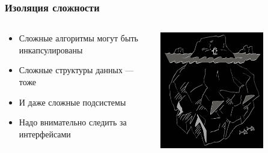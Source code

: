 \documentclass{../cscslides}
\begin{document}
    \begin{frame}
        \frametitle{Изоляция сложности}
        \begin{columns}
            \begin{column}{0.6\textwidth}
                \begin{itemize}
                    \item Сложные алгоритмы могут быть инкапсулированы
                    \item Сложные структуры данных --- тоже
                    \item И даже сложные подсистемы
                    \item Надо внимательно следить за интерфейсами
                \end{itemize}
            \end{column}
            \begin{column}{0.4\textwidth}
                \includegraphics[width=0.7\textwidth]{complexityBlack.png}
            \end{column}
        \end{columns}
    \end{frame}
\end{document}
